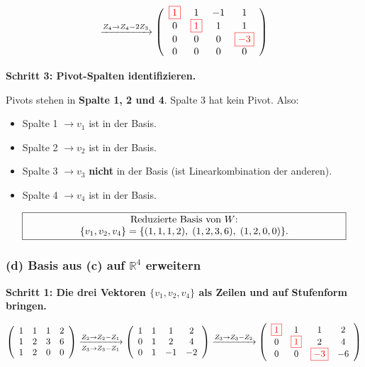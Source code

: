 \documentclass[a4paper,12pt]{article}
\newcommand{\piv}[1]{{\color{red}\boxed{#1}}}
\begin{document}
\[
\xrightarrow{Z_4 \to Z_4 - 2Z_3}
\left(\begin{array}{cccc}
\piv{1} & 1 & -1 & 1 \\
0 & \piv{1} & 1 & 1 \\
0 & 0 & 0 & \piv{-3} \\
0 & 0 & 0 & 0
\end{array}\right)
\]

\textbf{Schritt 3: Pivot-Spalten identifizieren.}

Pivots stehen in \textbf{Spalte 1, 2 und 4}. Spalte 3 hat kein Pivot. Also:
\begin{itemize}[leftmargin=*, nosep]
\item Spalte 1 $\to v_1$ ist in der Basis.
\item Spalte 2 $\to v_2$ ist in der Basis.
\item Spalte 3 $\to v_3$ \textbf{nicht} in der Basis (ist Linearkombination der anderen).
\item Spalte 4 $\to v_4$ ist in der Basis.
\end{itemize}

\[
\fbox{\parbox{0.93\textwidth}{\centering
Reduzierte Basis von $W$: $\{v_1, v_2, v_4\} = \{(1,1,1,2),\; (1,2,3,6),\; (1,2,0,0)\}.$
}}
\]

\subsubsection*{(d) Basis aus (c) auf $\mathbb{R}^4$ erweitern}

\textbf{Schritt 1: Die drei Vektoren $\{v_1, v_2, v_4\}$ als Zeilen und auf Stufenform bringen.}

\[
\left(\begin{array}{cccc}
1 & 1 & 1 & 2 \\
1 & 2 & 3 & 6 \\
1 & 2 & 0 & 0
\end{array}\right)
\xrightarrow[Z_3 \to Z_3 - Z_1]{Z_2 \to Z_2 - Z_1}
\left(\begin{array}{cccc}
1 & 1 & 1 & 2 \\
0 & 1 & 2 & 4 \\
0 & 1 & -1 & -2
\end{array}\right)
\xrightarrow{Z_3 \to Z_3 - Z_2}
\left(\begin{array}{cccc}
\piv{1} & 1 & 1 & 2 \\
0 & \piv{1} & 2 & 4 \\
0 & 0 & \piv{-3} & -6
\end{array}\right)
\]
\end{document}
